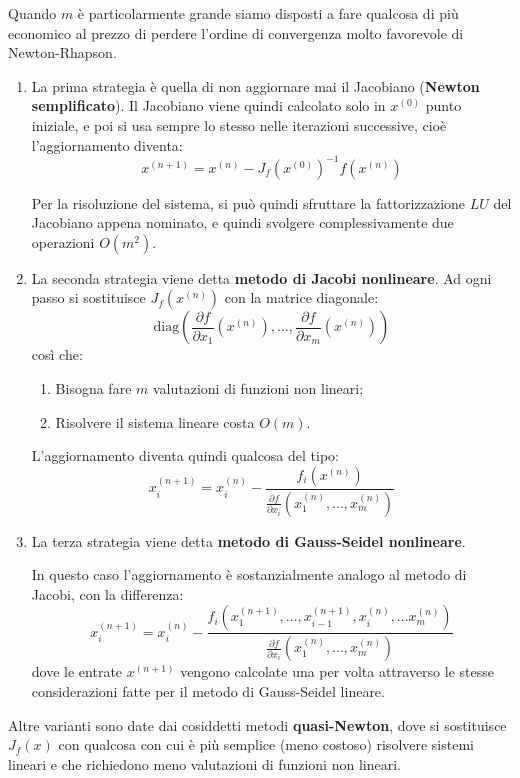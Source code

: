 \documentclass[a4paper,11pt]{article}
\begin{document}
Quando $m$ è particolarmente grande siamo disposti a fare qualcosa di più economico al prezzo di perdere l'ordine di convergenza molto favorevole di Newton-Rhapson.

\begin{enumerate}
	\item La prima strategia è quella di non aggiornare mai il Jacobiano (\textbf{Newton semplificato}).
		Il Jacobiano viene quindi calcolato solo in $x^{(0)}$ punto iniziale, e poi si usa sempre lo stesso nelle iterazioni successive, cioè l'aggiornamento diventa:
		$$
		x^{(n + 1)} = x^{(n)} - J_f(x^{(0)})^{-1} f(x^{(n)})
		$$
		
		Per la risoluzione del sistema, si può quindi sfruttare la fattorizzazione $LU$ del Jacobiano appena nominato, e quindi svolgere complessivamente due operazioni $O(m^2)$.

	\item La seconda strategia viene detta \textbf{metodo di Jacobi nonlineare}.
		Ad ogni passo si sostituisce $J_f(x^{(n)})$ con la matrice diagonale:
		$$
		\mathrm{diag} \left( \frac{\partial f}{\partial x_1} (x^{(n)}), ..., \frac{\partial f}{\partial x_m} (x^{(n)}) \right)
		$$
		così che:
		\begin{enumerate}
			\item Bisogna fare $m$ valutazioni di funzioni non lineari;
			\item Risolvere il sistema lineare costa $O(m)$.
		\end{enumerate}

		L'aggiornamento diventa quindi qualcosa del tipo:
		$$
		x_i^{(n + 1)} = x_i^{(n)} - \frac{f_i(x^{(n)})}{\frac{\partial f}{\partial x_i} (x_1^{(n)}, ..., x_m^{(n)})}
		$$

	\item La terza strategia viene detta \textbf{metodo di Gauss-Seidel nonlineare}.

		In questo caso l'aggiornamento è sostanzialmente analogo al metodo di Jacobi, con la differenza:
		$$
		x_i^{(n + 1)} = x_i^{(n)} - \frac{f_i(x_1^{(n + 1)}, ..., x_{i - 1}^{(n + 1)}, x_i^{(n)}, ... x_m^{(n)})}{\frac{\partial f}{\partial x_i} (x_1^{(n)}, ..., x_m^{(n)})}
		$$
		dove le entrate $x^{(n + 1)}$ vengono calcolate una per volta attraverso le stesse considerazioni fatte per il metodo di Gauss-Seidel lineare.
\end{enumerate}

Altre varianti sono date dai cosiddetti metodi \textbf{quasi-Newton}, dove si sostituisce $J_f(x)$ con qualcosa con cui è più semplice (meno costoso) risolvere sistemi lineari e che richiedono meno valutazioni di funzioni non lineari.
\end{document}
